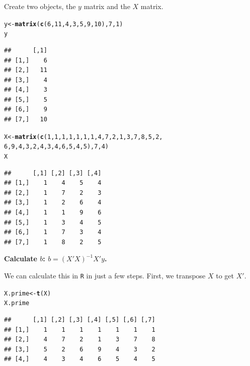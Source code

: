 \documentclass[11pt,openany]{book}\usepackage[]{graphicx}\usepackage[]{color}
\makeatletter
\newcommand{\hlnum}[1]{\textcolor[rgb]{0.686,0.059,0.569}{#1}}%
\newcommand{\hlstd}[1]{\textcolor[rgb]{0.345,0.345,0.345}{#1}}%
\newcommand{\hlkwb}[1]{\textcolor[rgb]{0.69,0.353,0.396}{#1}}%
\newcommand{\hlkwd}[1]{\textcolor[rgb]{0.737,0.353,0.396}{\textbf{#1}}}%
\newenvironment{kframe}{%
 \def\at@end@of@kframe{}%
 \ifinner\ifhmode%
  \def\at@end@of@kframe{\end{minipage}}%
  \begin{minipage}{\columnwidth}%
 \fi\fi%
 \def\FrameCommand##1{\hskip\@totalleftmargin \hskip-\fboxsep
 \colorbox{shadecolor}{##1}\hskip-\fboxsep
     \hskip-\linewidth \hskip-\@totalleftmargin \hskip\columnwidth}%
 \MakeFramed {\advance\hsize-\width
   \@totalleftmargin\z@ \linewidth\hsize
   \@setminipage}}%
 {\par\unskip\endMakeFramed%
 \at@end@of@kframe}
\newenvironment{knitrout}{}{} %
\renewenvironment{knitrout}{\begin{singlespace}}{\end{singlespace}} %
\makeatother
\begin{document}
\noindent Create two objects, the $y$ matrix and the $X$ matrix. 
\begin{knitrout}
\color{fgcolor}\begin{kframe}
\begin{alltt}
\hlstd{y} \hlkwb{<-} \hlkwd{matrix}\hlstd{(}\hlkwd{c}\hlstd{(}\hlnum{6}\hlstd{,} \hlnum{11}\hlstd{,} \hlnum{4}\hlstd{,} \hlnum{3}\hlstd{,} \hlnum{5}\hlstd{,} \hlnum{9}\hlstd{,} \hlnum{10}\hlstd{),} \hlnum{7}\hlstd{,} \hlnum{1}\hlstd{)}
\hlstd{y}
\end{alltt}
\begin{verbatim}
##      [,1]
## [1,]    6
## [2,]   11
## [3,]    4
## [4,]    3
## [5,]    5
## [6,]    9
## [7,]   10
\end{verbatim}
\begin{alltt}
\hlstd{X} \hlkwb{<-} \hlkwd{matrix}\hlstd{(}\hlkwd{c}\hlstd{(}\hlnum{1}\hlstd{,} \hlnum{1}\hlstd{,} \hlnum{1}\hlstd{,} \hlnum{1}\hlstd{,} \hlnum{1}\hlstd{,} \hlnum{1}\hlstd{,} \hlnum{1}\hlstd{,} \hlnum{4}\hlstd{,} \hlnum{7}\hlstd{,} \hlnum{2}\hlstd{,} \hlnum{1}\hlstd{,} \hlnum{3}\hlstd{,} \hlnum{7}\hlstd{,} \hlnum{8}\hlstd{,} \hlnum{5}\hlstd{,} \hlnum{2}\hlstd{,}
    \hlnum{6}\hlstd{,} \hlnum{9}\hlstd{,} \hlnum{4}\hlstd{,} \hlnum{3}\hlstd{,} \hlnum{2}\hlstd{,} \hlnum{4}\hlstd{,} \hlnum{3}\hlstd{,} \hlnum{4}\hlstd{,} \hlnum{6}\hlstd{,} \hlnum{5}\hlstd{,} \hlnum{4}\hlstd{,} \hlnum{5}\hlstd{),} \hlnum{7}\hlstd{,} \hlnum{4}\hlstd{)}
\hlstd{X}
\end{alltt}
\begin{verbatim}
##      [,1] [,2] [,3] [,4]
## [1,]    1    4    5    4
## [2,]    1    7    2    3
## [3,]    1    2    6    4
## [4,]    1    1    9    6
## [5,]    1    3    4    5
## [6,]    1    7    3    4
## [7,]    1    8    2    5
\end{verbatim}
\end{kframe}
\end{knitrout}

\noindent \textbf{Calculate $b$:
$b = (X'X)^{-1}X'y$.} 

\noindent We can calculate this in \texttt{R} in just a few steps. First, we transpose $X$ to get $X'$. 
\begin{knitrout}
\color{fgcolor}\begin{kframe}
\begin{alltt}
\hlstd{X.prime} \hlkwb{<-} \hlkwd{t}\hlstd{(X)}
\hlstd{X.prime}
\end{alltt}
\begin{verbatim}
##      [,1] [,2] [,3] [,4] [,5] [,6] [,7]
## [1,]    1    1    1    1    1    1    1
## [2,]    4    7    2    1    3    7    8
## [3,]    5    2    6    9    4    3    2
## [4,]    4    3    4    6    5    4    5
\end{verbatim}
\end{kframe}
\end{knitrout}
\end{document}
